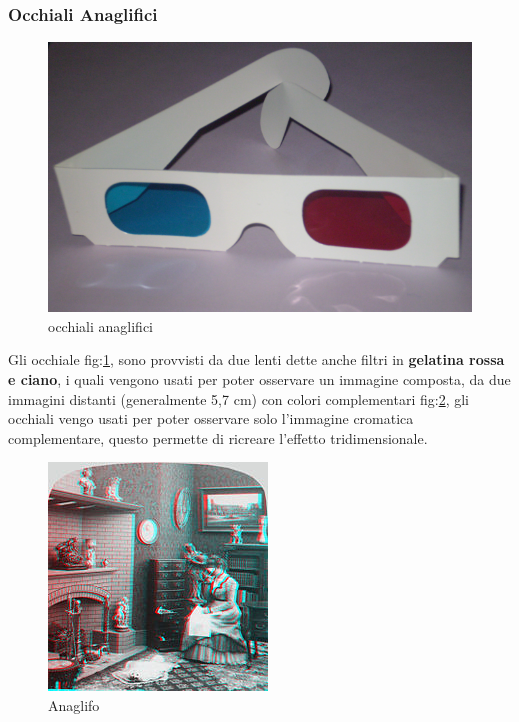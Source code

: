 \documentclass[10pt,a4paper]{article}
\begin{document}
	\subsubsection{Occhiali Anaglifici}
	\begin{figure}[H]
		\centering
		\includegraphics[width=0.6\linewidth]{image/occhiali_anaglifici}
		\caption{occhiali anaglifici}
		\label{fig:occhiali_anaglifici}
	\end{figure}
	Gli occhiale fig:\ref{fig:occhiali_anaglifici}, sono provvisti da due lenti dette anche  filtri in \textbf{gelatina rossa e ciano}, i quali vengono usati per poter osservare un immagine composta, da due immagini distanti (generalmente 5,7 cm) con colori complementari fig:\ref{fig:anaglifo}, gli occhiali vengo usati per poter osservare solo l'immagine cromatica complementare, questo permette di ricreare l'effetto tridimensionale.
	 \begin{figure}[H]
	 	\centering
	 	\includegraphics[width=0.6\linewidth]{image/anaglifo}
	 	\caption{Anaglifo }
	 	\label{fig:anaglifo}
	 \end{figure}
 \newpage
\end{document}
